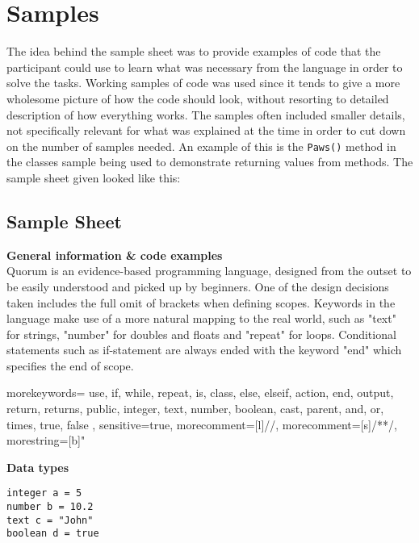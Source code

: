\section{Samples}
The idea behind the sample sheet was to provide examples of code that the participant could use to learn what was necessary from the language in order to solve the tasks.
Working samples of code was used since it tends to give a more wholesome picture of how the code should look, without resorting to detailed description of how everything works.
The samples often included smaller details, not specifically relevant for what was explained at the time in order to cut down on the number of samples needed.
An example of this is the \lstinline!Paws()! method in the classes sample being used to demonstrate returning values from methods.
The sample sheet given looked like this:%

\subsection{Sample Sheet}
\textbf{General information \& code examples}\\
Quorum is an evidence-based programming language, designed from the outset to be easily understood and picked up by beginners. One of the design decisions taken includes the full omit of brackets when defining scopes. Keywords in the language make use of a more natural mapping to the real world, such as "text" for strings, "number" for doubles and floats  and "repeat" for loops. Conditional statements such as if-statement are always ended with the keyword "end" which specifies the end of scope.

{
  morekeywords={
    use,
    if,
    while,
    repeat,
    is,
    class,
    else,
    elseif,
    action,
    end,
    output,
    return,
    returns,
    public,
    integer,
    text,
    number,
    boolean,
    cast,
    parent,
    and,
    or,
    times,
    true,
    false
  },
  sensitive=true, %
  morecomment=[l]{//}, %
  morecomment=[s]{/*}{*/}, %
  morestring=[b]" %
}

\textbf{Data types}\\
\begin{lstlisting}[language=Quorum]
integer a = 5
number b = 10.2
text c = "John"
boolean d = true
\end{lstlisting}

